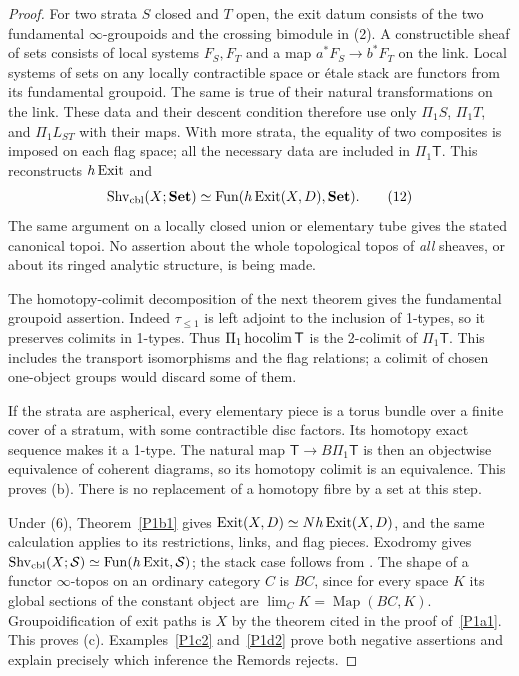 \begin{proof}
For two strata $S$ closed and $T$ open, the exit datum consists of the
two fundamental $\infty$-groupoids and the crossing bimodule in (2).
A constructible sheaf of sets consists of local systems $F_S,F_T$ and
a map $a^*F_S\to b^*F_T$ on the link.  Local systems of sets on any
locally contractible space or étale stack are functors from its
fundamental groupoid.  The same is true of their natural
transformations on the link.  These data and their descent condition
therefore use only $\Pi_1 S$, $\Pi_1 T$, and $\Pi_1 L_{ST}$ with
their maps.  With more strata, the equality of two composites is
imposed on each flag space; all the necessary data are included in
$\Pi_1\mathsf T$.  This reconstructs $h\operatorname{Exit}$ and
\[
 \operatorname{Shv}_{\rm cbl}(X;\mathbf{Set})
      \simeq\operatorname{Fun}(h\operatorname{Exit}(X,D),\mathbf{Set}).    \tag{12}
\]
The same argument on a locally closed union or elementary tube gives
the stated canonical topoi.  No assertion about the whole topological
topos of \emph{all} sheaves, or about its ringed analytic structure,
is being made.

The homotopy-colimit decomposition of the next theorem gives the
fundamental groupoid assertion.  Indeed $\tau_{\leq1}$ is left
adjoint to the inclusion of 1-types, so it preserves colimits in
1-types.  Thus $\Pi_1\operatorname{hocolim}\mathsf T$ is the 2-colimit of
$\Pi_1\mathsf T$.  This includes the transport isomorphisms and
the flag relations; a colimit of chosen one-object groups would
discard some of them.

If the strata are aspherical, every elementary piece is a torus
bundle over a finite cover of a stratum, with some contractible disc
factors.  Its homotopy exact sequence makes it a 1-type.  The natural
map $\mathsf T\to B\Pi_1\mathsf T$ is then an objectwise equivalence
of coherent diagrams, so its homotopy colimit is an equivalence.
This proves (b).  There is no replacement of a homotopy fibre by a
set at this step.

Under (6), Theorem~\ref{P1b1} gives
$\operatorname{Exit}(X,D)\simeq N h\operatorname{Exit}(X,D)$, and the same calculation applies
to its restrictions, links, and flag pieces.  Exodromy gives
$\operatorname{Shv}_{\rm cbl}(X;\mathcal S)\simeq
\operatorname{Fun}(h\operatorname{Exit},\mathcal S)$; the stack case follows from
\citet[Proposition 3.24]{JansenToolbox2024}.  The shape of a functor
$\infty$-topos on an ordinary category $C$ is $BC$, since for every
space $K$ its global sections of the constant object are
$\lim_C K=\operatorname{Map}(BC,K)$.  Groupoidification of exit paths
is $X$ by the theorem cited in the proof of~\ref{P1a1}.  This proves
(c).  Examples~\ref{P1c2} and~\ref{P1d2} prove both negative
assertions and explain precisely which inference the Remords rejects.
\end{proof}

